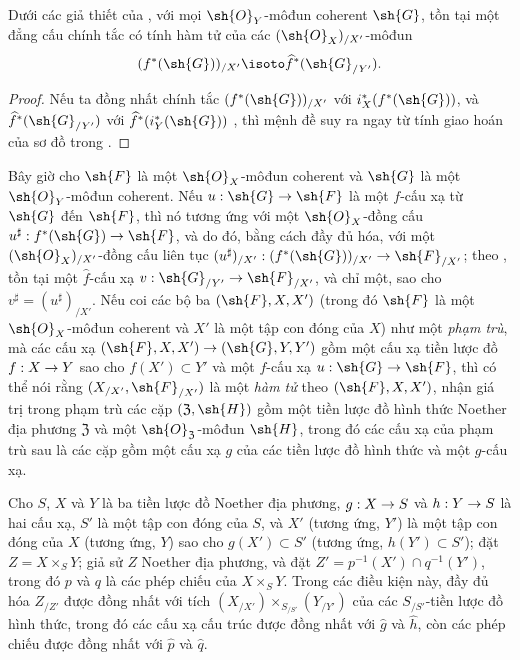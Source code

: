 \documentclass[oneside]{amsart}
\makeatletter
\newcommand{\ega@arrow}[2]{\mathchoice{#1}{#2}{#2}{#2}}
\renewcommand{\to}{\ega@arrow{\longrightarrow}{\rightarrow}}
\newcommand{\oldpage}[2][]{{\marginnote{\normalfont\textbf{#1}~|~#2}}\ignorespaces}
\let\EGAOriginalLabel\label
\renewcommand{\label}[1]{\phantomsection\EGAOriginalLabel{#1}}
\makeatother
\begin{document}
\begin{proposition}[10.9.5]
\label{I.10.9.5}
Dưới các giả thiết của , với mọi $\sh{O}_Y$-môđun coherent $\sh{G}$, tồn tại một đẳng cấu chính tắc có tính hàm tử của các $(\sh{O}_X)_{/X'}$-môđun
\[
  (f^*(\sh{G}))_{/X'}\isoto\widehat{f}^*(\sh{G}_{/Y'}).
\]
\end{proposition}

\begin{proof}
Nếu ta đồng nhất chính tắc $(f^*(\sh{G}))_{/X'}$ với $i_X^*(f^*(\sh{G}))$, và $\widehat{f}^*(\sh{G}_{/Y'})$ với $\widehat{f}^*(i_Y^*(\sh{G}))$ , thì mệnh đề suy ra ngay từ tính giao hoán của sơ đồ trong .
\end{proof}

\begin{env}[10.9.6]
\label{I.10.9.6}
Bây giờ cho $\sh{F}$ là một $\sh{O}_X$-môđun coherent và $\sh{G}$ là một $\sh{O}_Y$-môđun coherent.
Nếu $u:\sh{G}\to\sh{F}$ là một $f$-cấu xạ từ $\sh{G}$ đến $\sh{F}$, thì nó tương ứng với một $\sh{O}_X$-đồng cấu $u^\sharp:f^*(\sh{G})\to\sh{F}$, và do đó, bằng cách đầy đủ hóa, với một $(\sh{O}_X)_{/X'}$-đồng cấu liên tục $(u^\sharp)_{/X'}:(f^*(\sh{G}))_{/X'}\to\sh{F}_{/X'}$; theo , tồn tại một $\widehat{f}$-cấu xạ $v:\sh{G}_{/Y'}\to\sh{F}_{/X'}$,
\oldpage[I]{200}
và chỉ một, sao cho $v^\sharp=(u^\sharp)_{/X'}$.
Nếu coi các bộ ba $(\sh{F},X,X')$ (trong đó $\sh{F}$ là một $\sh{O}_X$-môđun coherent và $X'$ là một tập con đóng của $X$) như một \emph{phạm trù}, mà các cấu xạ $(\sh{F},X,X')\to(\sh{G},Y,Y')$ gồm một cấu xạ tiền lược đồ $f:X\to Y$ sao cho $f(X')\subset Y'$ và một $f$-cấu xạ $u:\sh{G}\to\sh{F}$, thì có thể nói rằng $(X_{/X'},\sh{F}_{/X'})$ là một \emph{hàm tử} theo $(\sh{F},X,X')$, nhận giá trị trong phạm trù các cặp $(\mathfrak{Z},\sh{H})$ gồm một tiền lược đồ hình thức Noether địa phương $\mathfrak{Z}$ và một $\sh{O}_\mathfrak{Z}$-môđun $\sh{H}$, trong đó các cấu xạ của phạm trù sau là các cặp gồm một cấu xạ $g$ của các tiền lược đồ hình thức và một $g$-cấu xạ.
\end{env}

\begin{proposition}[10.9.7]
\label{I.10.9.7}
Cho $S$, $X$ và $Y$ là ba tiền lược đồ Noether địa phương, $g:X\to S$ và $h:Y\to S$ là hai cấu xạ, $S'$ là một tập con đóng của $S$, và $X'$ (tương ứng, $Y'$) là một tập con đóng của $X$ (tương ứng, $Y$) sao cho $g(X')\subset S'$ (tương ứng, $h(Y')\subset S'$); đặt $Z=X\times_S Y$; giả sử $Z$ Noether địa phương, và đặt $Z'=p^{-1}(X')\cap q^{-1}(Y')$, trong đó $p$ và $q$ là các phép chiếu của $X\times_S Y$.
Trong các điều kiện này, đầy đủ hóa $Z_{/Z'}$ được đồng nhất với tích $(X_{/X'})\times_{S_{/S'}}(Y_{/Y'})$ của các $S_{/S'}$-tiền lược đồ hình thức, trong đó các cấu xạ cấu trúc được đồng nhất với $\widehat{g}$ và $\widehat{h}$, còn các phép chiếu được đồng nhất với $\widehat{p}$ và $\widehat{q}$.
\end{proposition}
\end{document}
